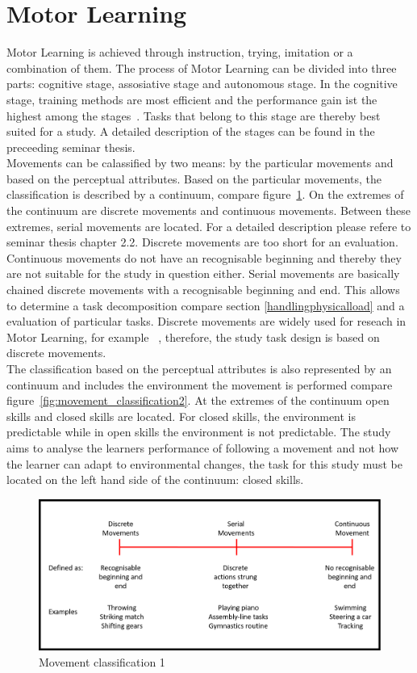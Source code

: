 \section{Motor Learning}
\label{section:motor_learning}
Motor Learning is achieved through instruction, trying, imitation or a combination of them. The process of Motor Learning can be divided into three parts: cognitive stage, assosiative stage and autonomous stage. In the cognitive stage, training methods are most efficient and the performance gain ist the highest among the stages~\cite{mlbook}. Tasks that belong to this stage are thereby best suited for a study. A detailed description of the stages can be found in the preceeding seminar thesis.\\
Movements can be calassified by two means: by the particular movements  and based on the perceptual attributes. Based on the particular movements, the classification is described by a continuum, compare figure~\ref{fig:movement_classification1}. On the extremes of the continuum are discrete movements and continuous movements. Between these extremes, serial movements are located. For a detailed description please refere to seminar thesis chapter 2.2. Discrete movements are too short for an evaluation. Continuous movements do not have an recognisable beginning and thereby they are not suitable for the study in question either. Serial movements are basically chained discrete movements with a recognisable beginning and end. This allows to determine a task decomposition compare section \ref{handlingphysicalload} and a evaluation of particular tasks. Discrete movements are widely used for reseach in Motor Learning, for example ~\cite{lightguide,mythaichicoaches,elearningma}, therefore, the study task design is based on discrete movements.\\
The classification based on the perceptual attributes is also represented by an continuum and includes the environment the movement is performed compare figure~\ref{fig:movement_classification2}. At the extremes of the continuum open skills and closed skills are located. For closed skills, the environment is predictable while in open skills the environment is not predictable. The study aims to analyse the learners performance of following a movement and not how the learner can adapt to environmental changes, the task for this study must be located on the left hand side of the continuum: closed skills.
\begin{figure}[htb]
	\centering
	\includegraphics[width=\textwidth]{figures/movement_classification.png}
	\caption[Movement classification 1]{Movement classification 1 \cite{mlbook}}
	\label{fig:movement_classification1}
\end{figure}
